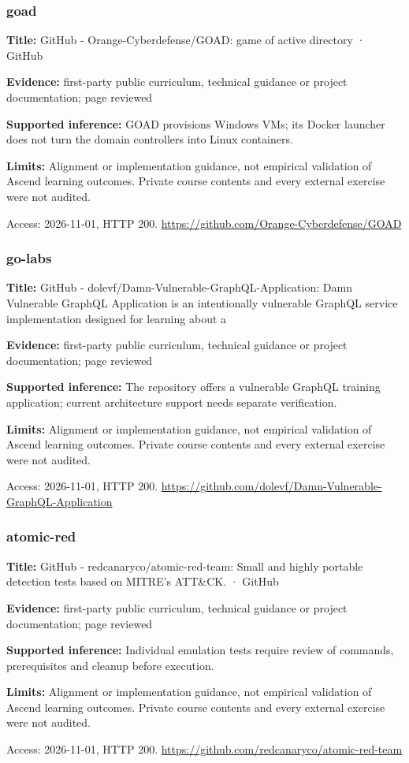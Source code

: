 \subsubsection{goad}
\noindent\textbf{Title:} GitHub - Orange-Cyberdefense/GOAD: game of active directory · GitHub\par
\noindent\textbf{Evidence:} first-party public curriculum, technical guidance or project documentation; page reviewed\par
\noindent\textbf{Supported inference:} GOAD provisions Windows VMs; its Docker launcher does not turn the domain controllers into Linux containers.\par
\noindent\textbf{Limits:} Alignment or implementation guidance, not empirical validation of Ascend learning outcomes. Private course contents and every external exercise were not audited.\par
\noindent Access: 2026-11-01, HTTP 200. \url{https://github.com/Orange-Cyberdefense/GOAD}
\subsubsection{go-labs}
\noindent\textbf{Title:} GitHub - dolevf/Damn-Vulnerable-GraphQL-Application: Damn Vulnerable GraphQL Application is an intentionally vulnerable GraphQL service implementation designed for learning about a\par
\noindent\textbf{Evidence:} first-party public curriculum, technical guidance or project documentation; page reviewed\par
\noindent\textbf{Supported inference:} The repository offers a vulnerable GraphQL training application; current architecture support needs separate verification.\par
\noindent\textbf{Limits:} Alignment or implementation guidance, not empirical validation of Ascend learning outcomes. Private course contents and every external exercise were not audited.\par
\noindent Access: 2026-11-01, HTTP 200. \url{https://github.com/dolevf/Damn-Vulnerable-GraphQL-Application}
\subsubsection{atomic-red}
\noindent\textbf{Title:} GitHub - redcanaryco/atomic-red-team: Small and highly portable detection tests based on MITRE's ATT\&CK. · GitHub\par
\noindent\textbf{Evidence:} first-party public curriculum, technical guidance or project documentation; page reviewed\par
\noindent\textbf{Supported inference:} Individual emulation tests require review of commands, prerequisites and cleanup before execution.\par
\noindent\textbf{Limits:} Alignment or implementation guidance, not empirical validation of Ascend learning outcomes. Private course contents and every external exercise were not audited.\par
\noindent Access: 2026-11-01, HTTP 200. \url{https://github.com/redcanaryco/atomic-red-team}
